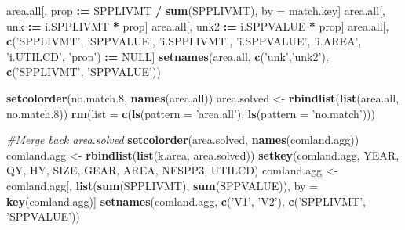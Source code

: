 \documentclass[]{article}
\newenvironment{Shaded}{\begin{snugshade}}{\end{snugshade}}
\newcommand{\KeywordTok}[1]{\textcolor[rgb]{0.13,0.29,0.53}{\textbf{#1}}}
\newcommand{\DataTypeTok}[1]{\textcolor[rgb]{0.13,0.29,0.53}{#1}}
\newcommand{\DecValTok}[1]{\textcolor[rgb]{0.00,0.00,0.81}{#1}}
\newcommand{\StringTok}[1]{\textcolor[rgb]{0.31,0.60,0.02}{#1}}
\newcommand{\CommentTok}[1]{\textcolor[rgb]{0.56,0.35,0.01}{\textit{#1}}}
\newcommand{\OtherTok}[1]{\textcolor[rgb]{0.56,0.35,0.01}{#1}}
\newcommand{\OperatorTok}[1]{\textcolor[rgb]{0.81,0.36,0.00}{\textbf{#1}}}
\newcommand{\ErrorTok}[1]{\textcolor[rgb]{0.64,0.00,0.00}{\textbf{#1}}}
\newcommand{\NormalTok}[1]{#1}
\begin{document}
\begin{Shaded}
\begin{Highlighting}[]
{{\NormalTok{  area.all[, prop }\OperatorTok{:}\ErrorTok{=}\StringTok{ }\NormalTok{SPPLIVMT }\OperatorTok{/}\StringTok{ }\KeywordTok{sum}\NormalTok{(SPPLIVMT), by =}\StringTok{ }\NormalTok{match.key]}
\NormalTok{  area.all[, unk  }\OperatorTok{:}\ErrorTok{=}\StringTok{ }\NormalTok{i.SPPLIVMT }\OperatorTok{*}\StringTok{ }\NormalTok{prop]}
\NormalTok{  area.all[, unk2 }\OperatorTok{:}\ErrorTok{=}\StringTok{ }\NormalTok{i.SPPVALUE }\OperatorTok{*}\StringTok{ }\NormalTok{prop]}
\NormalTok{  area.all[, }\KeywordTok{c}\NormalTok{(}\StringTok{'SPPLIVMT'}\NormalTok{, }\StringTok{'SPPVALUE'}\NormalTok{, }\StringTok{'i.SPPLIVMT'}\NormalTok{, }\StringTok{'i.SPPVALUE'}\NormalTok{, }\StringTok{'i.AREA'}\NormalTok{, }
               \StringTok{'i.UTILCD'}\NormalTok{, }\StringTok{'prop'}\NormalTok{) }\OperatorTok{:}\ErrorTok{=}\StringTok{ }\OtherTok{NULL}\NormalTok{]}
  \KeywordTok{setnames}\NormalTok{(area.all, }\KeywordTok{c}\NormalTok{(}\StringTok{'unk'}\NormalTok{,}\StringTok{'unk2'}\NormalTok{), }\KeywordTok{c}\NormalTok{(}\StringTok{'SPPLIVMT'}\NormalTok{, }\StringTok{'SPPVALUE'}\NormalTok{))}
  
  \KeywordTok{setcolorder}\NormalTok{(no.match.}\DecValTok{8}\NormalTok{, }\KeywordTok{names}\NormalTok{(area.all))}
\NormalTok{  area.solved <-}\StringTok{ }\KeywordTok{rbindlist}\NormalTok{(}\KeywordTok{list}\NormalTok{(area.all, no.match.}\DecValTok{8}\NormalTok{))}
  \KeywordTok{rm}\NormalTok{(}\DataTypeTok{list =} \KeywordTok{c}\NormalTok{(}\KeywordTok{ls}\NormalTok{(}\DataTypeTok{pattern =} \StringTok{'area.all'}\NormalTok{), }\KeywordTok{ls}\NormalTok{(}\DataTypeTok{pattern =} \StringTok{'no.match'}\NormalTok{)))}
  
  \CommentTok{#Merge back area.solved}
  \KeywordTok{setcolorder}\NormalTok{(area.solved, }\KeywordTok{names}\NormalTok{(comland.agg))}
\NormalTok{  comland.agg <-}\StringTok{ }\KeywordTok{rbindlist}\NormalTok{(}\KeywordTok{list}\NormalTok{(k.area, area.solved))}
  \KeywordTok{setkey}\NormalTok{(comland.agg,}
\NormalTok{         YEAR,}
\NormalTok{         QY,}
\NormalTok{         HY,}
\NormalTok{         SIZE,}
\NormalTok{         GEAR,}
\NormalTok{         AREA,}
\NormalTok{         NESPP3,}
\NormalTok{         UTILCD)}
\NormalTok{  comland.agg <-}\StringTok{ }\NormalTok{comland.agg[, }\KeywordTok{list}\NormalTok{(}\KeywordTok{sum}\NormalTok{(SPPLIVMT), }\KeywordTok{sum}\NormalTok{(SPPVALUE)), }
\NormalTok{                             by =}\StringTok{ }\KeywordTok{key}\NormalTok{(comland.agg)]}
  \KeywordTok{setnames}\NormalTok{(comland.agg, }\KeywordTok{c}\NormalTok{(}\StringTok{'V1'}\NormalTok{, }\StringTok{'V2'}\NormalTok{), }\KeywordTok{c}\NormalTok{(}\StringTok{'SPPLIVMT'}\NormalTok{, }\StringTok{'SPPVALUE'}\NormalTok{))  }

}}
\end{Highlighting}
\end{Shaded}
\end{document}

